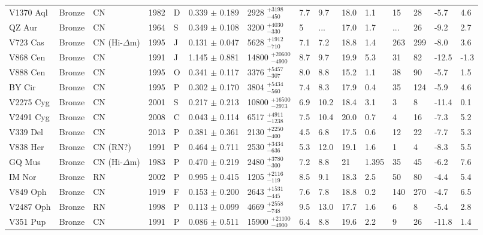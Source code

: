 \documentclass[a4paper,fleqn,usenatbib]{mnras}
\begin{document}
\begin{table*}
\begin{tabular}{lllllllllllllll}
V1370 Aql	&	Bronze	&	CN	&	1982	&	D	&	0.339	$\pm$	0.189	&	2928	$_{-	450	}^{+	3198	}$ &	7.7	&	9.7	&	18.0	&	1.1	&	15	&	28	&	-5.7	&	4.6	\\
QZ Aur	&	Bronze	&	CN	&	1964	&	S	&	0.349	$\pm$	0.108	&	3200	$_{-	330	}^{+	4030	}$ &	5	&	...	&	17.0	&	1.7	&	...	&	26	&	-9.2	&	2.7	\\
V723 Cas	&	Bronze	&	CN (Hi-$\Delta$m)	&	1995	&	J	&	0.131	$\pm$	0.047	&	5628	$_{-	710	}^{+	1912	}$ &	7.1	&	7.2	&	18.8	&	1.4	&	263	&	299	&	-8.0	&	3.6	\\
V868 Cen	&	Bronze	&	CN	&	1991	&	J	&	1.145	$\pm$	0.881	&	14800	$_{-	4900	}^{+	20600	}$ &	8.7	&	9.7	&	19.9	&	5.3	&	31	&	82	&	-12.5	&	-1.3	\\
V888 Cen	&	Bronze	&	CN	&	1995	&	O	&	0.341	$\pm$	0.117	&	3376	$_{-	307	}^{+	5457	}$ &	8.0	&	8.8	&	15.2	&	1.1	&	38	&	90	&	-5.7	&	1.5	\\
BY Cir	&	Bronze	&	CN	&	1995	&	P	&	0.302	$\pm$	0.170	&	3804	$_{-	560	}^{+	5434	}$ &	7.4	&	8.3	&	17.9	&	0.4	&	35	&	124	&	-5.9	&	4.6	\\
V2275 Cyg	&	Bronze	&	CN	&	2001	&	S	&	0.217	$\pm$	0.213	&	10800	$_{-	2973	}^{+	16500	}$ &	6.9	&	10.2	&	18.4	&	3.1	&	3	&	8	&	-11.4	&	0.1	\\
V2491 Cyg	&	Bronze	&	CN	&	2008	&	C	&	0.043	$\pm$	0.114	&	6517	$_{-	1238	}^{+	4911	}$ &	7.5	&	10.4	&	20.0	&	0.7	&	4	&	16	&	-7.3	&	5.2	\\
V339 Del	&	Bronze	&	CN	&	2013	&	P	&	0.381	$\pm$	0.361	&	2130	$_{-	400	}^{+	2250	}$ &	4.5	&	6.8	&	17.5	&	0.6	&	12	&	22	&	-7.7	&	5.3	\\
V838 Her	&	Bronze	&	CN (RN?)	&	1991	&	P	&	0.464	$\pm$	0.711	&	2530	$_{-	636	}^{+	3434	}$ &	5.3	&	12.0	&	19.1	&	1.6	&	1	&	4	&	-8.3	&	5.5	\\
GQ Mus	&	Bronze	&	CN (Hi-$\Delta$m)	&	1983	&	P	&	0.470	$\pm$	0.219	&	2480	$_{-	300	}^{+	3780	}$ &	7.2	&	8.8	&	21	&	1.395	&	35	&	45	&	-6.2	&	7.6	\\
IM Nor	&	Bronze	&	RN	&	2002	&	P	&	0.995	$\pm$	0.415	&	1205	$_{-	119	}^{+	2116	}$ &	8.5	&	9.1	&	18.3	&	2.5	&	50	&	80	&	-4.4	&	5.4	\\
V849 Oph	&	Bronze	&	CN	&	1919	&	F	&	0.153	$\pm$	0.200	&	2643	$_{-	445	}^{+	1531	}$ &	7.6	&	7.8	&	18.8	&	0.2	&	140	&	270	&	-4.7	&	6.5	\\
V2487 Oph	&	Bronze	&	RN	&	1998	&	P	&	0.113	$\pm$	0.099	&	4669	$_{-	748	}^{+	2558	}$ &	9.5	&	13.0	&	17.7	&	1.6	&	6	&	8	&	-5.4	&	2.8	\\
V351 Pup	&	Bronze	&	CN	&	1991	&	P	&	0.086	$\pm$	0.511	&	15900	$_{-	4900	}^{+	21100	}$ &	6.4	&	8.8	&	19.6	&	2.2	&	9	&	26	&	-11.8	&	1.4	\\

\end{tabular}
\end{table*}
\end{document}
